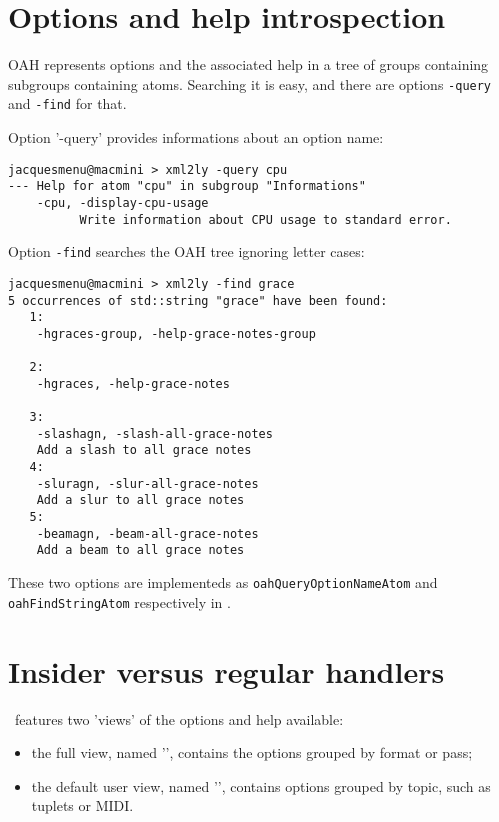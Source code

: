 {\begin{lstlisting}[language=CPlusPlus]
\end{lstlisting}


\section{Options and help introspection}

OAH represents options and the associated help in a tree of groups containing subgroups containing atoms. Searching it is easy, and there are options {\tt -query} and {\tt -find} for that.

Option '-query' provides informations about an option name:
\begin{lstlisting}[language=Terminal]
jacquesmenu@macmini > xml2ly -query cpu
--- Help for atom "cpu" in subgroup "Informations"
    -cpu, -display-cpu-usage
          Write information about CPU usage to standard error.
\end{lstlisting}

Option {\tt -find} searches the OAH tree ignoring letter cases:
\begin{lstlisting}[language=Terminal]
jacquesmenu@macmini > xml2ly -find grace
5 occurrences of std::string "grace" have been found:
   1:
    -hgraces-group, -help-grace-notes-group

   2:
    -hgraces, -help-grace-notes

   3:
    -slashagn, -slash-all-grace-notes
    Add a slash to all grace notes
   4:
    -sluragn, -slur-all-grace-notes
    Add a slur to all grace notes
   5:
    -beamagn, -beam-all-grace-notes
    Add a beam to all grace notes
\end{lstlisting}

These two options are implementeds as {\tt oahQueryOptionNameAtom} and {\tt oahFindStringAtom} respectively in .


\section{Insider versus regular handlers}

\mf\ features two 'views' of the options and help available:
\begin{itemize}
\item the full view, named '\insider', contains the options grouped by format or pass;
\item the default user view, named '\regular', contains options grouped by topic, such as tuplets or MIDI.
\end{itemize}

}
